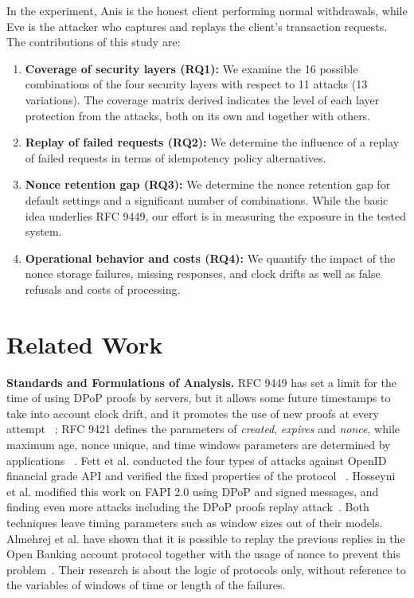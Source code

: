 \documentclass[conference]{IEEEtran}
\begin{document}
In the experiment, Anis is the honest client performing normal withdrawals, while Eve is the attacker who captures and replays the client’s transaction requests. The contributions of this study are:

\begin{enumerate}
\item \textbf{Coverage of security layers (RQ1):} We examine the 16 possible combinations of the four security layers with respect to 11 attacks (13 variations). The coverage matrix derived indicates the level of each layer protection from the attacks, both on its own and together with others.

\item \textbf{Replay of failed requests (RQ2):} We determine the influence of a replay of failed requests in terms of idempotency policy alternatives.

\item \textbf{Nonce retention gap (RQ3):} We determine the nonce retention gap for default settings and a significant number of combinations. While the basic idea underlies RFC 9449, our effort is in measuring the exposure in the tested system.

\item \textbf{Operational behavior and costs (RQ4):} We quantify the impact of the nonce storage failures, missing responses, and clock drifts as well as false refusals and costs of processing.

\end{enumerate}



\section{Related Work}\label{sec:related}

\textbf{Standards and Formulations of Analysis.}
RFC 9449 has set a limit for the time of using DPoP proofs by servers, but it allows some future timestamps to take into account clock drift, and it promotes the use of new proofs at every attempt ~\cite{rfc9449}; RFC 9421 defines the parameters of \emph{created}, \emph{expires} and \emph{nonce}, while maximum age, nonce unique, and time windows parameters are determined by applications ~\cite{rfc9421}. Fett et al. conducted the four types of attacks against OpenID financial grade API and verified the fixed properties of the protocol ~\cite{fett19}. Hosseyni et al. modified this work on FAPI 2.0 using DPoP and signed messages, and finding even more attacks including the DPoP proofs replay attack~\cite{hosseyni24}. Both techniques leave timing parameters such as window sizes out of their models. Almehrej et al. have shown that it is possible to replay the previous replies in the Open Banking account protocol together with the usage of nonce to prevent this problem~\cite{almehrej}. Their research is about the logic of protocols only, without reference to the variables of windows of time or length of the failures.
\end{document}
